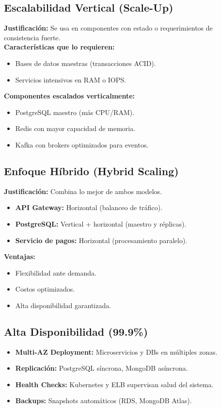 	\subsection*{Escalabilidad Vertical (Scale-Up)}
		\noindent \textbf{Justificación:} Se usa en componentes con estado o requerimientos de consistencia fuerte. \\
		
		\textbf{Características que lo requieren:}
		\begin{itemize}
			\item Bases de datos maestras (transacciones ACID).
			\item Servicios intensivos en RAM o IOPS.
		\end{itemize}
		
		\textbf{Componentes escalados verticalmente:}
		\begin{itemize}
			\item PostgreSQL maestro (más CPU/RAM).
			\item Redis con mayor capacidad de memoria.
			\item Kafka con brokers optimizados para eventos.
		\end{itemize}
	
	\subsection*{Enfoque Híbrido (Hybrid Scaling)}
		\noindent \textbf{Justificación:} Combina lo mejor de ambos modelos.
		
		\begin{itemize}
			\item \textbf{API Gateway:} Horizontal (balanceo de tráfico).
			\item \textbf{PostgreSQL:} Vertical + horizontal (maestro y réplicas).
			\item \textbf{Servicio de pagos:} Horizontal (procesamiento paralelo).
		\end{itemize}
		
		\textbf{Ventajas:}
		\begin{itemize}
			\item Flexibilidad ante demanda.
			\item Costos optimizados.
			\item Alta disponibilidad garantizada.
		\end{itemize}
	
	\subsection*{Alta Disponibilidad (99.9\%)}
	\begin{itemize}
		\item \textbf{Multi-AZ Deployment:} Microservicios y DBs en múltiples zonas.
		\item \textbf{Replicación:} PostgreSQL síncrona, MongoDB asíncrona.
		\item \textbf{Health Checks:} Kubernetes y ELB supervisan salud del sistema.
		\item \textbf{Backups:} Snapshots automáticos (RDS, MongoDB Atlas).
	\end{itemize}